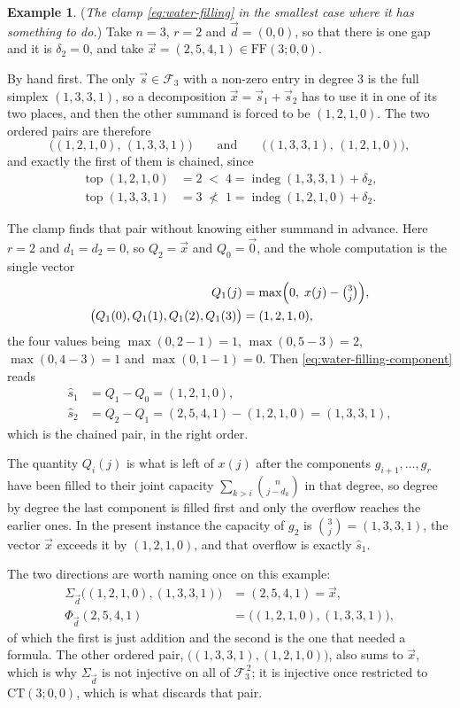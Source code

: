 \documentclass[11pt, a4paper, abstract=yes]{scrartcl}
\theoremstyle{definition}
\newtheorem{mexample}[definition]{Example}
\theoremstyle{remark}
\theoremstyle{plain}
\newcommand{\indeg}{\operatorname{indeg}}
\newcommand{\tp}{\operatorname{top}}
\begin{document}
\begin{mexample}
(\emph{The clamp \eqref{eq:water-filling} in the smallest case where it has something to do.}) Take
\(n=3\), \(r=2\) and \(\vec d=(0,0)\), so that there is one gap and it is \(\delta_2=0\), and take
\(\vec x=(2,5,4,1)\in\mathrm{FF}(3;0,0)\).

By hand first. The only \(\vec s\in\mathcal F_3\) with a non-zero entry in degree \(3\) is the
full simplex \((1,3,3,1)\), so a decomposition \(\vec x=\vec s_1+\vec s_2\) has to use it in one of
its two places, and then the other summand is forced to be \((1,2,1,0)\). The two ordered pairs are
therefore
\[
  \bigl((1,2,1,0),\,(1,3,3,1)\bigr)
  \qquad\text{and}\qquad
  \bigl((1,3,3,1),\,(1,2,1,0)\bigr),
\]
and exactly the first of them is chained, since
\begin{align*}
  \tp(1,2,1,0)&=2\;<\;4=\indeg(1,3,3,1)+\delta_2 ,\\
  \tp(1,3,3,1)&=3\;\not<\;1=\indeg(1,2,1,0)+\delta_2 .
\end{align*}

The clamp finds that pair without knowing either summand in advance. Here \(r=2\)
and \(d_1=d_2=0\), so \(Q_2=\vec x\) and \(Q_0=\vec 0\), and the whole computation is the single
vector
\begin{align*}
  Q_1(j) &= \max\Bigl(0,\;x(j)-\tbinom 3j\Bigr),\\
  \bigl(Q_1(0),Q_1(1),Q_1(2),Q_1(3)\bigr) &= (1,2,1,0),
\end{align*}
the four values being \(\max(0,2-1)=1\), \(\max(0,5-3)=2\), \(\max(0,4-3)=1\) and
\(\max(0,1-1)=0\). Then \eqref{eq:water-filling-component} reads
\begin{align*}
  \hat s_1 &= Q_1-Q_0=(1,2,1,0),\\
  \hat s_2 &= Q_2-Q_1=(2,5,4,1)-(1,2,1,0)=(1,3,3,1),
\end{align*}
which is the chained pair, in the right order.

The quantity \(Q_i(j)\) is what is left of \(x(j)\) after the
components \(g_{i+1},\dots,g_r\) have been filled to their joint capacity
\(\sum_{k>i}\binom n{j-d_k}\) in that degree, so degree by degree the last component is filled
first and only the overflow reaches the earlier ones. In the present instance the capacity of
\(g_2\) is \(\binom 3j=(1,3,3,1)\), the vector \(\vec x\) exceeds it by \((1,2,1,0)\), and that
overflow is exactly \(\hat s_1\).

The two directions are worth naming once on this example:
\begin{align*}
  \Sigma_{\vec d}\bigl((1,2,1,0),(1,3,3,1)\bigr) &= (2,5,4,1)=\vec x,\\
  \Phi_{\vec d}(2,5,4,1) &= \bigl((1,2,1,0),(1,3,3,1)\bigr),
\end{align*}
of which the first is just addition and the second is the one that needed a
formula. The other ordered pair, \(\bigl((1,3,3,1),(1,2,1,0)\bigr)\), also sums to \(\vec x\), which
is why \(\Sigma_{\vec d}\) is not injective on all of \(\mathcal F_3^{\,2}\); it is injective once
restricted to \(\mathrm{CT}(3;0,0)\), which is what discards that pair.
\label{ex-water-filling}
\end{mexample}
\end{document}
